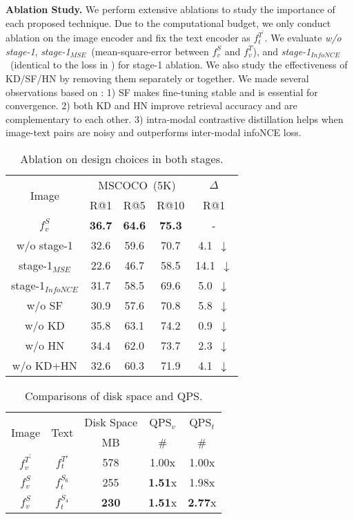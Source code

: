 \textbf{Ablation Study.} We perform extensive ablations to study the importance of each proposed technique. Due to the computational budget, we only conduct ablation on the image encoder and fix the text encoder as $f_t^{T^\prime}$. We evaluate  \textit{w/o stage-1}, \textit{stage-1$_{MSE}$}~(mean-square-error between $f_v^{S}$ and $f_v^{T}$), and \textit{stage-1$_{InfoNCE}$}~(identical to the loss in ) for stage-1 ablation. We also study the effectiveness of KD/SF/HN by removing them separately or together. We made several observations based on : 1) SF makes fine-tuning stable and is essential for convergence. 2) both KD and HN improve retrieval accuracy and are complementary to each other. 3) intra-modal contrastive distillation helps when image-text pairs are noisy and outperforms inter-modal infoNCE loss.

\begin{table}[t!]
	\centering
	\small
	\begin{tabular}{c|ccc|c}
		\toprule
		\multirow{2}{*}{Image} &\multicolumn{3}{c|}{MSCOCO~(5K)} & $\Delta$\\
		&R@1 &R@5  &R@10  & R@1\\
		\cline{1-5}
		$f_v^{S}$  &\textbf{36.7} &\textbf{64.6} &\textbf{75.3} & -\\
		\cline{1-5}
		w/o stage-1 &32.6 &59.6 &70.7 &4.1~$\downarrow$ \\
		stage-1$_{MSE}$ &22.6  &46.7 &58.5 &14.1~$\downarrow$ \\
		stage-1$_{InfoNCE}$ &31.7 &58.5 &69.6 &5.0~$\downarrow$ \\
		\cline{1-5}
		w/o SF &30.9 &57.6 &70.8  &5.8~$\downarrow$\\
		w/o KD &35.8 &63.1 &74.2 &0.9~$\downarrow$\\
		w/o HN &34.4 &62.0 &73.7 &2.3~$\downarrow$\\
		w/o KD+HN &32.6 &60.3 &71.9 &4.1~$\downarrow$ \\
		\bottomrule
	\end{tabular}
	\caption{Ablation on design choices in both stages.}
	\label{table:main3}
\end{table}

\begin{table}[t!]
	\centering
	\small
	\begin{tabular}{cc|ccc}
		\toprule
		\multirow{2}{*}{Image}&\multirow{2}{*}{Text} & Disk Space &QPS$_v$ &QPS$_t$  \\
		&  &MB &\#  &\#  \\
		\cline{1-5}
		$f_v^{T^\prime}$ & $f_t^{T\prime}$ &578  &1.00x &1.00x \\
		\cline{1-5}
		$f_v^{S}$ & $f_t^{S_6}$ &255 &\textbf{1.51}x &1.98x \\
		$f_v^{S}$ & $f_t^{S_4}$ &\textbf{230} &\textbf{1.51}x &\textbf{2.77}x \\
		\bottomrule
	\end{tabular}
	\caption{Comparisons of disk space and QPS.}
	\label{table:main2}
\end{table}

